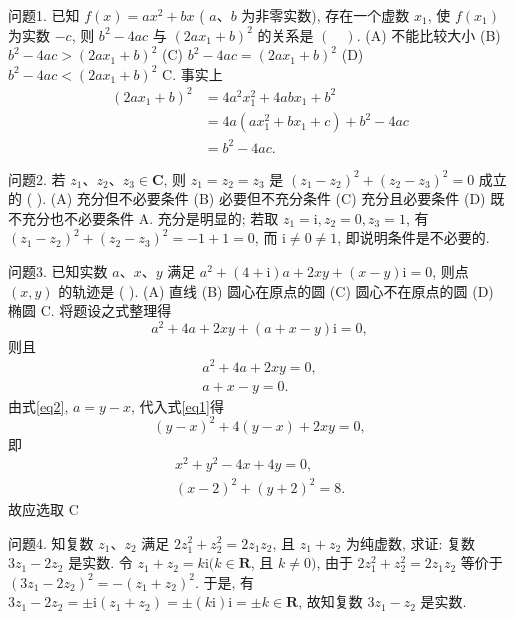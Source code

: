
问题1. 已知 $f(x)=a x^2+b x$ ( $a 、 b$ 为非零实数), 存在一个虚数 $x_1$, 使 $f\left(x_1\right)$ 为实数 $-c$, 则 $b^2-4 a c$ 与 $\left(2 a x_1+b\right)^2$ 的关系是 $(\quad)$.
(A) 不能比较大小
(B) $b^2-4 a c>\left(2 a x_1+b\right)^2$
(C) $b^2-4 a c=\left(2 a x_1+b\right)^2$
(D) $b^2-4 a c<\left(2 a x_1+b\right)^2$
C.
事实上
$$
\begin{aligned}
\left(2 a x_1+b\right)^2 & =4 a^2 x_1^2+4 a b x_1+b^2 \\
& =4 a\left(a x_1^2+b x_1+c\right)+b^2-4 a c \\
& =b^2-4 a c .
\end{aligned}
$$



问题2. 若 $z_1 、 z_2 、 z_3 \in \mathbf{C}$, 则 $z_1=z_2=z_3$ 是 $\left(z_1-z_2\right)^2+\left(z_2-z_3\right)^2=0$ 成立的 ( ).
(A) 充分但不必要条件
(B) 必要但不充分条件
(C) 充分且必要条件
(D) 既不充分也不必要条件
A.
充分是明显的; 若取 $z_1=\mathrm{i}, z_2=0, z_3=1$, 有 $\left(z_1-z_2\right)^2+\left(z_2-z_3\right)^2= -1+1=0$, 而 $\mathrm{i} \neq 0 \neq 1$, 即说明条件是不必要的.



问题3. 已知实数 $a 、 x 、 y$ 满足 $a^2+(4+\mathrm{i}) a+2 x y+(x-y) \mathrm{i}=0$, 则点 $(x, y)$ 的轨迹是 ( ).
(A) 直线
(B) 圆心在原点的圆
(C) 圆心不在原点的圆
(D) 椭圆
C.
将题设之式整理得
$$
a^2+4 a+2 x y+(a+x-y) \mathrm{i}=0,
$$
则且
$$
\begin{gathered}
a^2+4 a+2 x y=0, \label{eq1}\\
a+x-y=0 . \label{eq2}
\end{gathered}
$$
由式\ref{eq2}, $a=y-x$, 代入式\ref{eq1}得
$$
(y-x)^2+4(y-x)+2 x y=0,
$$
即
$$
\begin{gathered}
x^2+y^2-4 x+4 y=0, \\
(x-2)^2+(y+2)^2=8 .
\end{gathered}
$$
故应选取 C



问题4. 知复数 $z_1 、 z_2$ 满足 $2 z_1^2+z_2^2=2 z_1 z_2$, 且 $z_1+z_2$ 为纯虚数, 求证: 复数 $3 z_1-2 z_2$ 是实数.
令 $z_1+z_2=k \mathrm{i}(k \in \mathbf{R}$, 且 $k \neq 0)$, 由于 $2 z_1^2+z_2^2=2 z_1 z_2$ 等价于 $\left(3 z_1-2 z_2\right)^2=-\left(z_1+z_2\right)^2$.
于是, 有 $3 z_1-2 z_2= \pm \mathrm{i}\left(z_1+z_2\right)= \pm(k \mathrm{i}) \mathrm{i}= \pm k \in \mathbf{R}$, 故知复数 $3 z_1-z_2$ 是实数.



